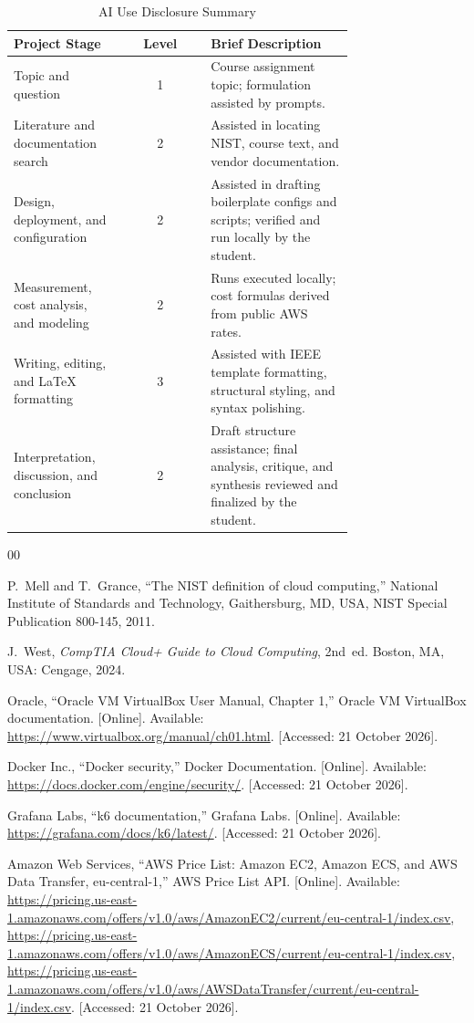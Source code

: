 \documentclass[conference,a4paper]{IEEEtran}
\begin{document}
\begin{table}[htbp]
	\caption{AI Use Disclosure Summary}
	\label{tab:ai_use}
	\centering
	\footnotesize
	\begin{tabular}{|p{0.32\linewidth}|c|p{0.42\linewidth}|}
		\hline
		\textbf{Project Stage} & \textbf{Level} & \textbf{Brief Description} \\
		\hline
		Topic and question & 1 & Course assignment topic; formulation assisted by prompts. \\
		\hline
		Literature and documentation search & 2 & Assisted in locating NIST, course text, and vendor documentation. \\
		\hline
		Design, deployment, and configuration & 2 & Assisted in drafting boilerplate configs and scripts; verified and run locally by the student. \\
		\hline
		Measurement, cost analysis, and modeling & 2 & Runs executed locally; cost formulas derived from public AWS rates. \\
		\hline
		Writing, editing, and LaTeX formatting & 3 & Assisted with IEEE template formatting, structural styling, and syntax polishing. \\
		\hline
		Interpretation, discussion, and conclusion & 2 & Draft structure assistance; final analysis, critique, and synthesis reviewed and finalized by the student. \\
		\hline
	\end{tabular}
\end{table}

\begin{thebibliography}{00}

	 P.~Mell and T.~Grance, ``The NIST definition of cloud computing,'' National Institute of Standards and Technology, Gaithersburg, MD, USA, NIST Special Publication 800-145, 2011.

	 J.~West, \textit{CompTIA Cloud+ Guide to Cloud Computing}, 2nd~ed. Boston, MA, USA: Cengage, 2024.

	 Oracle, ``Oracle VM VirtualBox User Manual, Chapter 1,'' Oracle VM VirtualBox documentation. [Online]. Available: \url{https://www.virtualbox.org/manual/ch01.html}. [Accessed: 21 October 2026].

	 Docker Inc., ``Docker security,'' Docker Documentation. [Online]. Available: \url{https://docs.docker.com/engine/security/}. [Accessed: 21 October 2026].

	 Grafana Labs, ``k6 documentation,'' Grafana Labs. [Online]. Available: \url{https://grafana.com/docs/k6/latest/}. [Accessed: 21 October 2026].

	 Amazon Web Services, ``AWS Price List: Amazon EC2, Amazon ECS, and AWS Data Transfer, eu-central-1,'' AWS Price List API. [Online]. Available: \url{https://pricing.us-east-1.amazonaws.com/offers/v1.0/aws/AmazonEC2/current/eu-central-1/index.csv}, \url{https://pricing.us-east-1.amazonaws.com/offers/v1.0/aws/AmazonECS/current/eu-central-1/index.csv}, \url{https://pricing.us-east-1.amazonaws.com/offers/v1.0/aws/AWSDataTransfer/current/eu-central-1/index.csv}. [Accessed: 21 October 2026].

\end{thebibliography}
\end{document}

